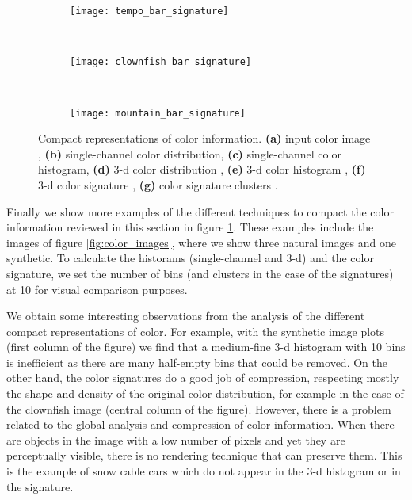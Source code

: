 \begin{figure}[!ht]
    \begin{subfigure}[t]{\textwidth+20pt\relax}
    	\makebox[20pt]{\raisebox{25pt}{}}%
    	\texttt{[image: tempo\_bar\_signature]}
    \end{subfigure}~ 
    \begin{subfigure}[b]{0.32\textwidth}
        \texttt{[image: clownfish\_bar\_signature]}
    \end{subfigure}~
    \begin{subfigure}[b]{0.32\textwidth}
        \texttt{[image: mountain\_bar\_signature]}
    \end{subfigure}
                    
	\caption{Compact representations of color information. {\small \textsf{\textbf{(a)}}} input color image , {\small \textsf{\textbf{(b)}}} single-channel color distribution, {\small \textsf{\textbf{(c)}}} single-channel color histogram, {\small \textsf{\textbf{(d)}}} 3-d color distribution , {\small \textsf{\textbf{(e)}}} 3-d color histogram , {\small \textsf{\textbf{(f)}}} 3-d color signature , {\small \textsf{\textbf{(g)}}} color signature clusters .}\label{fig:color_image_representations}    
\end{figure}

Finally we show more examples of the different techniques to compact the color information reviewed in this section in figure \ref{fig:color_image_representations}. These examples include the images of figure \ref{fig:color_images}, where we show three natural images and one synthetic. To calculate the historams (single-channel and 3-d) and the color signature, we set the number of bins (and clusters in the case of the signatures) at 10 for visual comparison purposes.

We obtain some interesting observations from the analysis of the different compact representations of color. For example, with the synthetic image plots (first column of the figure) we find that a medium-fine 3-d histogram with 10 bins is inefficient as there are many half-empty bins that could be removed. On the other hand, the color signatures do a good job of compression, respecting mostly the shape and density of the original color distribution, for example in the case of the clownfish image (central column of the figure). However, there is a problem related to the global analysis and compression of color information. When there are objects in the image with a low number of pixels and yet they are perceptually visible, there is no rendering technique that can preserve them. This is the example of snow cable cars which do not appear in the 3-d histogram or in the signature.

